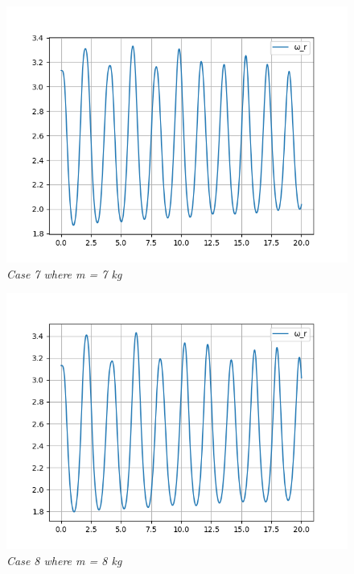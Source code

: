         \begin{figure}[H]
            \centering
            \includegraphics{Appendix/RSimPictures/F/fm7.png}
            \caption{\textit{Case 7 where m = 7 kg}}
            \label{}
        \end{figure}
            
        \begin{figure}[H]
            \centering
            \includegraphics{Appendix/RSimPictures/F/fm8.png}
            \caption{\textit{Case 8 where m = 8 kg}}
            \label{}
        \end{figure}
            
